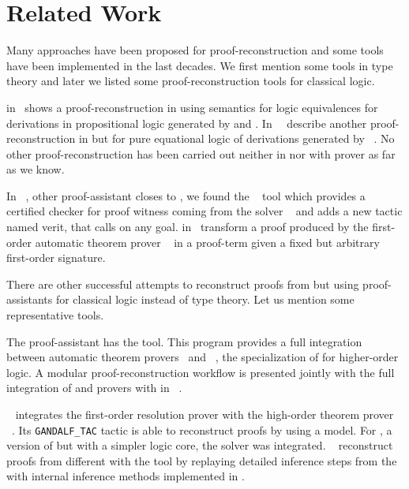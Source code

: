 \documentclass[../paper.tex]{subfiles}
\begin{document}

\section{Related Work}
\label{sec:related-work}

Many approaches have been proposed for proof-reconstruction and some tools have
been implemented in the last decades. We first mention some tools in type
theory and later we listed some proof-reconstruction tools for classical logic.

\citeauthor{Kanso2012} in~\cite{Kanso2012,kanso2016light} shows a
proof-reconstruction in \Agda using semantics for logic equivalences for
derivations in propositional logic generated by  and . In
\cite{foster2011integrating}~\citeauthor{foster2011integrating}~describe another
proof-reconstruction in \Agda but for pure equational logic of derivations
generated by ~\cite{hillenbrand1997}. No other
proof-reconstruction has been carried out neither in \Agda nor with \Metis
prover as far as we know.

In ~\cite{coqteam}, other proof-assistant closes to \Agda, we found
the ~\cite{armand2011,Ekici2017} tool which provides a certified
checker for proof witness coming from the \SMT solver
~\cite{bouton2009} and adds a new tactic named verit, that calls
 on any  goal. \citeauthor{Bezem2002} in~\cite{Bezem2002}
transform a proof produced by the first-order automatic theorem prover
~\cite{deNivelle2003} in a  proof-term given a fixed but
arbitrary first-order signature.

There are other successful attempts to reconstruct proofs from \ATPs but
using proof-assistants for classical logic instead of type theory.
Let us mention some representative tools.

The  proof-assistant has the  tool.
This program provides a full integration between
automatic theorem provers~\cite{blanchette2013extending,Fleury2014,bohme2010} and
~\cite{nipkow2002isabelle}, the specialization of
 for higher-order logic.
A modular proof-reconstruction workflow is presented jointly with
the full integration of  and  provers with
 in \citeauthor{Een2004}~\cite{Een2004}.

\citeauthor{Hurd1999}~\cite{Hurd1999} integrates the first-order resolution
prover  with the high-order theorem prover
~\cite{norrish2017hol}.
Its \verb!GANDALF_TAC! tactic is able to reconstruct  proofs
by using a  model. For , a version of
 but with a simpler logic core, the \SMT solver 
was integrated. \citeauthor{kaliszyk2013}~\cite{kaliszyk2013}
reconstruct proofs from different \ATPs with the  tool by
replaying detailed inference steps from the \ATPs with internal
inference methods implemented in .
\end{document}
